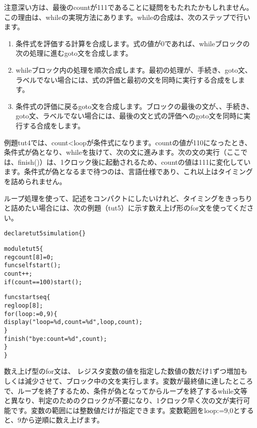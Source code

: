 注意深い方は、最後のcountが111であることに疑問をもたれたかもしれません。この理由は、whileの実現方法にあります。whileの合成は、次のステップで行います。

\begin{enumerate}
\item 条件式を評価する計算を合成します。式の値が0であれば、whileブロックの次の処理に進むgoto文を合成します。
\item whileブロック内の処理を順次合成します。最初の処理が、手続き、goto文、ラベルでない場合には、式の評価と最初の文を同時に実行する合成をします。
\item 条件式の評価に戻るgoto文を合成します。ブロックの最後の文が、、手続き、goto文、ラベルでない場合には、最後の文と式の評価へのgoto文を同時に実行する合成をします。
\end{enumerate}

例題tut4では、count\textless{}loopが条件式になります。countの値が110になったとき、条件式が偽となり、whileを抜けて、次の文に進みます。次の文の実行（ここでは、\textunderscore{}finish()）は、1クロック後に起動されるため、countの値は111に変化しています。条件式が偽となるまで待つのは、言語仕様であり、これ以上はタイミングを詰められません。

ループ処理を使って、記述をコンパクトにしたいけれど、タイミングをきっちりと詰めたい場合には、次の例題（tut5）に示す数え上げ形のfor文を使ってください。

\begin{reviewlist}
\begin{alltt}
declare tut5 simulation \{ \}

module tut5 \{
   reg count[8] = 0;
   func\textunderscore{}self  start();
   count++;
   if(count==100) start();

   func start seq \{
       reg loop[8];
       for(loop:=0,9) \{
            \textunderscore{}display("loop = \%d, count = \%d", loop, count);
       \}
       \textunderscore{}finish("bye: count = \%d", count);
    \}
 \}
\end{alltt}
\end{reviewlist}


数え上げ型のfor文は、 レジスタ変数の値を指定した数値の数だけ1ずつ増加もしくは減少させて、ブロック中の文を実行します。変数が最終値に達したところで、ループを終了するため、条件が偽となってからループを終了するwhile文等と異なり、判定のためのクロックが不要になり、1クロック早く次の文が実行可能です。変数の範囲には整数値だけが指定できます。変数範囲をloop:=9,0とすると、9から逆順に数え上げます。

